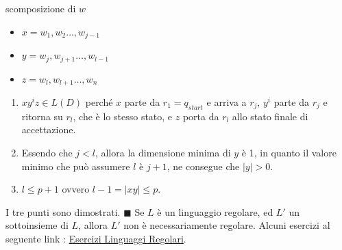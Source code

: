 \documentclass[10pt, letterpaper]{report}
\begin{document}
 scomposizione di $w$\begin{itemize}
    \item $x=w_1,w_2\dots,w_{j-1}$
    \item $y=w_j,w_{j+1}\dots,w_{l-1}$
    \item $z=w_l,w_{l+1}\dots,w_n$
 \end{itemize}\begin{enumerate}
    \item $xy^iz\in L(D)$ perché $x$ parte da $r_1=q_{start}$ e arriva a $r_j$, $y^i$ parte da $r_j$ e ritorna su $r_l$, che è 
    lo stesso stato, e $z$ porta da $r_l$ allo stato finale di accettazione.
    \item Essendo che $j<l$, allora la dimensione minima di $y$ è 1, in quanto il valore minimo che può assumere $l$ è $j+1$, ne consegue che $|y|>0$. 
    \item $l\le p+1$ ovvero $l-1=|xy|\le p$.
 \end{enumerate}
 I tre punti sono dimostrati. $\blacksquare$    \acc
 \prop{} Se $L$ è un linguaggio regolare, ed $L'$ un sottoinsieme di 
 $L$, allora $L'$ non è necessariamente regolare.\acc 
 Alcuni esercizi al seguente link : 
 \color{blue}\href{https://github.com/CasuFrost/University_notes/blob/main/Terzo%20Anno/Automi%2C%20Calcolabilit%C3%A0%20e%20Complessit%C3%A0/EsLinguaggiRegolari.pdf}{Esercizi Linguaggi Regolari}\color{black}.
 \flowerLine 
\end{document}
